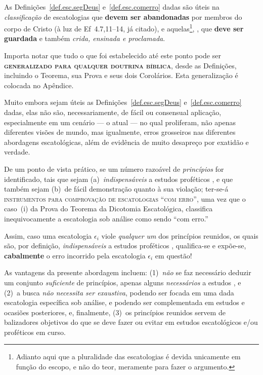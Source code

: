     As Definições~\ref{def.esc.segDeus} e~\ref{def.esc.comerro} dadas são úteis  na  \emph{classificação}  de  escatologias  que
    \textbf{devem  ser  abandonadas}  por  membros  do  corpo   de   Cristo   (à   luz   de   Ef~4.7,11--14,   já   citado),   e
    aquelas\footnote{Adianto aqui que a pluralidade das escatologias  é  devida  unicamente  em  função  do
    escopo, e não do teor, meramente para fazer o argumento.}, , que \textbf{deve ser  guardada}  e  também
    \emph{crida, ensinada e proclamada}.

    Importa notar que tudo o que foi estabelecido até este ponto pode ser \textbf{\textsc{generalizado  para  qualquer  doutrina
    bíblica}}, desde as Definições, incluindo o Teorema, sua Prova e seus dois Corolários.  Esta  generalização  é  colocada  no
    Apêndice.

    Muito embora sejam úteis as Definições~\ref{def.esc.segDeus} e~\ref{def.esc.comerro} dadas, elas não  são,  necessariamente,
    de fácil ou consensual aplicação, especialmente em um cenário --- o atual --- no  qual  proliferam,  não  apenas  diferentes
    visões de mundo, mas igualmente, erros grosseiros nas diferentes  abordagens  escatológicas,  além  de  evidência  de  muito
    desapreço por exatidão e verdade.

    De  um  ponto  de  vista  prático,  se  um  número  razoável  de  \emph{princípios}  for  identificado,   tais   que   sejam
    (a)~\emph{indispensáveis} a estudos proféticos , e que também sejam (b)~de fácil demonstração quanto  à
    sua violação; ter-se-á \textsc{instrumentos para comprovação de escatologias ``com erro''}, uma vez que o caso~(i) da  Prova
    do Teorema da Dicotomia Escatológica, classifica inequivocamente a escatologia sob análise como sendo ``com erro.''

    Assim, caso uma escatologia $\epsilon_i$ viole \emph{qualquer um} dos princípios reunidos,  os  quais  são,  por  definição,
    \emph{indispensáveis} a estudos proféticos ,  qualifica-se  e  expõe-se,  \textbf{cabalmente}  o  erro
    incorrido pela escatologia $\epsilon_i$ em questão!

    As vantagens da presente abordagem incluem: (1)~\emph{não} se  faz  necessário  deduzir  um  conjunto  \emph{suficiente}  de
    princípios, apenas alguns \emph{necessários} a  estudos  ,  e  (2)~a  busca  \emph{não  necessita  ser
    exaustiva}, podendo ser focada em uma dada escatologia específica sob análise, e podendo  ser  complementada  em  estudos  e
    ocasiões posteriores, e, finalmente, (3)~os princípios reunidos servem de balizadores objetivos do  que  se  deve  fazer  ou
    evitar em estudos escatológicos e/ou proféticos em curso.


